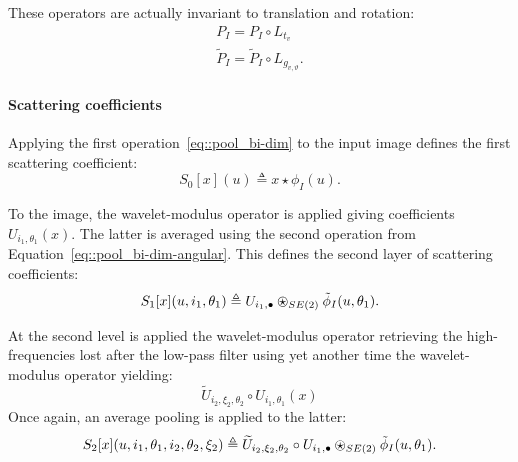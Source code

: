                 These operators are actually invariant to translation and rotation:
                \begin{align}
                    \label{eq::invariance_pooling}
                    P_I = P_I \circ L_{t_v}\\
                    \tilde{P}_I = \tilde{P}_I \circ L_{g_{v, \vartheta}}.
                \end{align}

            \paragraph{Scattering coefficients}
                Applying the first operation~\ref{eq::pool_bi-dim} to the input image defines the first scattering coefficient:
                \begin{equation}
                    \label{eq::scatter_input}
                    S_0[x](u) \triangleq x \star \phi_I (u).
                \end{equation}
                
                To the image, the wavelet-modulus operator is applied giving coefficients $U_{i_1, \theta_1}(x)$.
                The latter is averaged using the second operation from Equation~\ref{eq::pool_bi-dim-angular}.
                This defines the second layer of scattering coefficients:
                \begin{equation}
                    \label{eq::scatter_first}
                    S_1[x](u, i_1, \theta_1) \triangleq U_{i_1, \bullet} \ostar_{SE(2)} \tilde{\phi}_I(u, \theta_1).
                \end{equation}

                At the second level is applied the wavelet-modulus operator retrieving the high-frequencies lost after the low-pass filter using yet another time the wavelet-modulus operator yielding:
                \begin{equation}
                    \label{eq::cascade_second}
                    \widetilde{U}_{i_2,\xi_2, \theta_2} \circ U_{i_1, \theta_1}(x)
                \end{equation}
                Once again, an average pooling is applied to the latter:
                \begin{equation}
                    \label{eq::scatter_second}
                    S_2[x](u, i_1, \theta_1, i_2, \theta_2, \xi_2) \triangleq \widetilde{U}_{i_2,\xi_2, \theta_2} \circ U_{i_1, \bullet} \ostar_{SE(2)} \tilde{\phi}_I(u, \theta_1).
                \end{equation}
                
